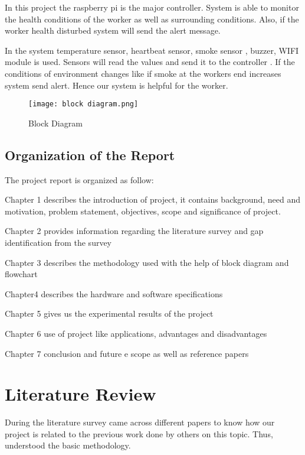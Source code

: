 \documentclass[12pt,a4paper]{report}
\begin{document}
\noindent                              In this project the raspberry pi is the major controller. System is able to monitor the health conditions of the worker as well as surrounding conditions. Also, if the worker health disturbed system will send the alert message.

\noindent      In the system temperature sensor, heartbeat sensor, smoke sensor , buzzer, WIFI module is used. Sensors will read the values and send it to the controller . If the conditions of environment changes like if smoke at the workers end increases system send alert. Hence our system is helpful for the worker.

\begin{figure}[htp]
    \centering
    \texttt{[image: block diagram.png]}
    \caption{Block Diagram}
\end{figure}

\noindent 
\newpage
\section{Organization of the Report}

\noindent The project report is organized as follow:

\noindent Chapter 1 describes the introduction of project, it contains background, need and motivation, problem statement, objectives, scope and significance of project.

\noindent Chapter 2 provides information regarding the literature survey and gap identification from the survey 

\noindent Chapter 3 describes the methodology used with the help of block diagram and flowchart 

\noindent Chapter4 describes the hardware and software specifications 

\noindent Chapter 5 gives us the experimental results of the project 

\noindent Chapter 6 use of project like applications, advantages and disadvantages 

\noindent Chapter 7 conclusion and future e scope as well as reference papers

\noindent \textbf{}
\newpage
\chapter{Literature Review}

\noindent During the literature survey  came across different papers to know how our project is related to the previous work done by others on this topic. Thus, understood the basic methodology.
\end{document}

